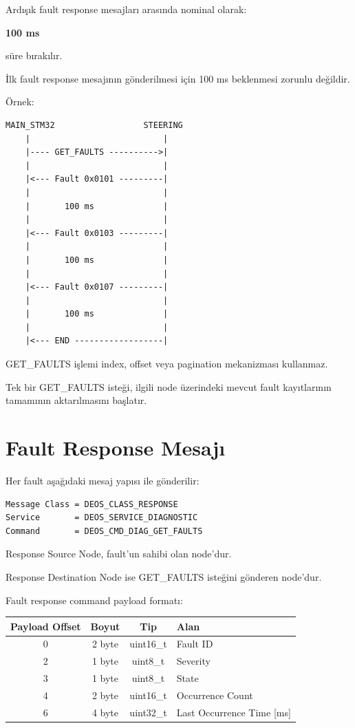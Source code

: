 \documentclass[a4paper,11pt]{article}
\begin{document}
Ardışık fault response mesajları arasında nominal olarak:

\begin{center}
\textbf{100 ms}
\end{center}

süre bırakılır.

İlk fault response mesajının gönderilmesi için 100 ms beklenmesi
zorunlu değildir.

Örnek:

\begin{lstlisting}
MAIN_STM32                  STEERING
    |                           |
    |---- GET_FAULTS ---------->|
    |                           |
    |<--- Fault 0x0101 ---------|
    |                           |
    |       100 ms              |
    |                           |
    |<--- Fault 0x0103 ---------|
    |                           |
    |       100 ms              |
    |                           |
    |<--- Fault 0x0107 ---------|
    |                           |
    |       100 ms              |
    |                           |
    |<--- END ------------------|
\end{lstlisting}

GET\_FAULTS işlemi index, offset veya pagination mekanizması kullanmaz.

Tek bir GET\_FAULTS isteği, ilgili node üzerindeki mevcut fault
kayıtlarının tamamının aktarılmasını başlatır.

\section{Fault Response Mesajı}

Her fault aşağıdaki mesaj yapısı ile gönderilir:

\begin{lstlisting}
Message Class = DEOS_CLASS_RESPONSE
Service       = DEOS_SERVICE_DIAGNOSTIC
Command       = DEOS_CMD_DIAG_GET_FAULTS
\end{lstlisting}

Response Source Node, fault'un sahibi olan node'dur.

Response Destination Node ise GET\_FAULTS isteğini gönderen node'dur.

Fault response command payload formatı:

\begin{center}
\begin{tabular}{c c c l}
\toprule
\textbf{Payload Offset} &
\textbf{Boyut} &
\textbf{Tip} &
\textbf{Alan} \\
\midrule
0 & 2 byte & uint16\_t & Fault ID \\
2 & 1 byte & uint8\_t  & Severity \\
3 & 1 byte & uint8\_t  & State \\
4 & 2 byte & uint16\_t & Occurrence Count \\
6 & 4 byte & uint32\_t & Last Occurrence Time [ms] \\
\bottomrule
\end{tabular}
\end{center}
\end{document}
